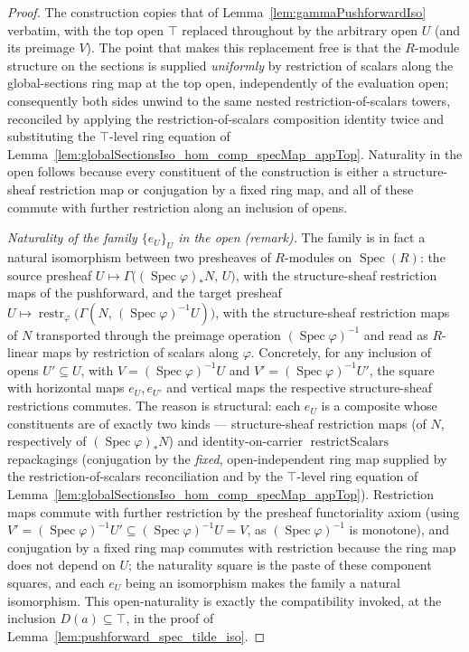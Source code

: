 \begin{proof}
  \leanok
  The construction copies that of Lemma~\ref{lem:gammaPushforwardIso} verbatim,
  with the top open \(\top\) replaced throughout by the arbitrary open \(U\) (and
  its preimage \(V\)). The point that makes this replacement free is that the
  \(R\)-module structure on the sections is supplied \emph{uniformly} by
  restriction of scalars along the global-sections ring map at the top open,
  independently of the evaluation open; consequently both sides unwind to the same
  nested restriction-of-scalars towers, reconciled by applying the
  restriction-of-scalars composition identity twice and substituting the
  \(\top\)-level ring equation of
  Lemma~\ref{lem:globalSectionsIso_hom_comp_specMap_appTop}. Naturality in the open
  follows because every constituent of the construction is either a structure-sheaf
  restriction map or conjugation by a fixed ring map, and all of these commute with
  further restriction along an inclusion of opens.

  \medskip
  \emph{Naturality of the family \(\{e_U\}_U\) in the open (remark).} The family is
  in fact a natural isomorphism between two presheaves of \(R\)-modules on
  \(\operatorname{Spec}(R)\): the source presheaf
  \(U \mapsto \Gamma\bigl((\operatorname{Spec}\varphi)_* N,\, U\bigr)\), with the
  structure-sheaf restriction maps of the pushforward, and the target presheaf
  \(U \mapsto
    \operatorname{restr}_\varphi\bigl(\Gamma(N,\, (\operatorname{Spec}\varphi)^{-1}U)\bigr)\),
  with the structure-sheaf restriction maps of \(N\) transported through the preimage
  operation \((\operatorname{Spec}\varphi)^{-1}\) and read as \(R\)-linear maps by
  restriction of scalars along \(\varphi\). Concretely, for any inclusion of opens
  \(U' \subseteq U\), with \(V = (\operatorname{Spec}\varphi)^{-1}U\) and
  \(V' = (\operatorname{Spec}\varphi)^{-1}U'\), the square with horizontal maps
  \(e_U, e_{U'}\) and vertical maps the respective structure-sheaf restrictions
  commutes. The reason is structural: each \(e_U\) is a composite whose constituents
  are of exactly two kinds — structure-sheaf restriction maps (of \(N\),
  respectively of \((\operatorname{Spec}\varphi)_* N\)) and identity-on-carrier
  \(\operatorname{restrictScalars}\) repackagings (conjugation by the \emph{fixed},
  open-independent ring map supplied by the restriction-of-scalars reconciliation and
  by the \(\top\)-level ring equation of
  Lemma~\ref{lem:globalSectionsIso_hom_comp_specMap_appTop}). Restriction maps commute
  with further restriction by the presheaf functoriality axiom (using
  \(V' = (\operatorname{Spec}\varphi)^{-1}U' \subseteq
  (\operatorname{Spec}\varphi)^{-1}U = V\), as \((\operatorname{Spec}\varphi)^{-1}\) is
  monotone), and conjugation by a fixed ring map commutes with restriction because the
  ring map does not depend on \(U\); the naturality square is the paste of these
  component squares, and each \(e_U\) being an isomorphism makes the family a natural
  isomorphism. This open-naturality is exactly the compatibility invoked, at the
  inclusion \(D(a) \subseteq \top\), in the proof of
  Lemma~\ref{lem:pushforward_spec_tilde_iso}.
\end{proof}

